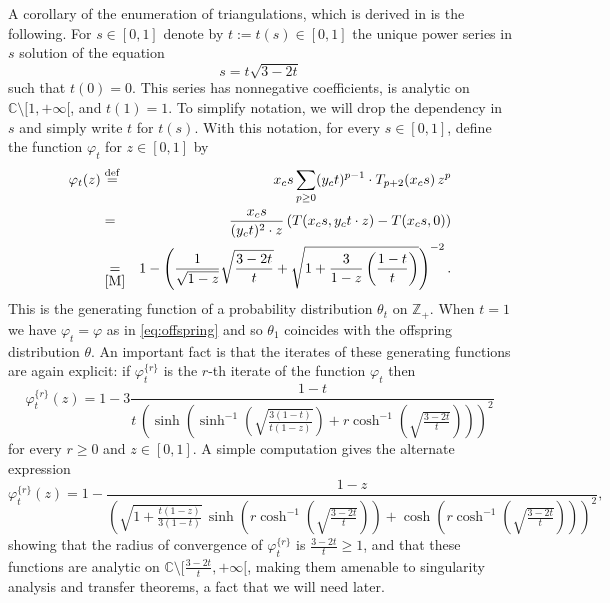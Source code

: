 \documentclass[AHL,XML,longabstracts,Unicode,NoSaveZebib]{cedram}
\begin{document}
A corollary of the enumeration of triangulations, which is derived in \cite[Section 3.1]{M} is the following. For $s \in [0,1]$ denote by $t := t(s) \in [0,1]$ the unique power series in $s$ solution of the equation
\begin{equation}
\label{eq:paramst}
s = t \sqrt{3-2t}
\end{equation}
such that $t(0) = 0$.
This series has nonnegative coefficients, is analytic on $\mathbb C \setminus [1,+\infty[$, and $t(1)=1$. To simplify notation, we will drop the dependency in $s$ and simply write $t$ for $t(s)$. With this notation, for every $s \in [0,1]$, define the function $\varphi_t$ for $z\in [0,1]$ by
 \begin{eqnarray}
\varphi_t(z) &\overset{ \mathrm{def}}{=}& x_c  s \sum_{p \geq 0}   (y_c  t)^{p-1} \cdot T_{p+2}(x_c  s) \, z^p\nonumber \\  &=& \frac{x_c  s}{(y_c  t)^2 \cdot z} \left( T(x_c  s, y_c  t \cdot z) - T(x_c  s,0) \right)\nonumber \\
& \underset{ \mbox{\cite[Sec. 3.1]{M}} }{=}&  1 - \left( \frac{1}{\sqrt{1-z}} \sqrt{\frac{3 -2t}{t}} + \sqrt{1 + \frac{3}{1-z} \left(\frac{1 -t}{t} \right)}\right)^{-2}. \label{eq:exprPhit} \end{eqnarray}
This is the generating function of a probability distribution $\theta_{t}$ on $\mathbb Z_+$. When $t=1$ we have $\varphi_{t} = \varphi$  as in \eqref{eq:offspring} and so $\theta_{1}$ coincides with the offspring distribution $\theta$. An important  fact \cite[Lemma 3]{M} is that the iterates of these generating functions are again explicit: if $\varphi_t^{\{r\}}$ is the $r$-th iterate of the function $\varphi_t$  then
\begin{equation}
\label{eq:iterPhit}
\varphi_t^{\{ r\}} (z) = 1 - 3 \frac{1-t}{t \, \left( \sinh \left( \sinh^{-1} \left( \sqrt{\frac{3(1-t)}{t(1-z)}}\right) + r \cosh^{-1} \left(\sqrt{\frac{3-2t}{t}} \right) \right) \right)^2}
\end{equation}
for every $r \geq 0$ and $z \in [0,1]$. A simple computation gives the alternate expression
\[
\varphi_t^{\{r\}} (z) = 1- \frac{1-z}{
\left(
\sqrt{1+\frac{t(1-z)}{3(1-t)}} \,
\sinh \left( r \cosh^{-1} \left(\sqrt{\frac{3-2t}{t}}\right) \right)
+
\cosh \left( r \cosh^{-1} \left(\sqrt{\frac{3-2t}{t}}\right) \right)
\right)^2},
\]
showing that the radius of convergence of $\varphi_t^{\{r\}}$ is $\frac{3-2t}{t} \geq 1$, and that these functions are analytic on $\mathbb C \setminus [\frac{3-2t}{t} , + \infty[$, making them amenable to singularity analysis and transfer theorems, a fact that we will need later.
\end{document}
